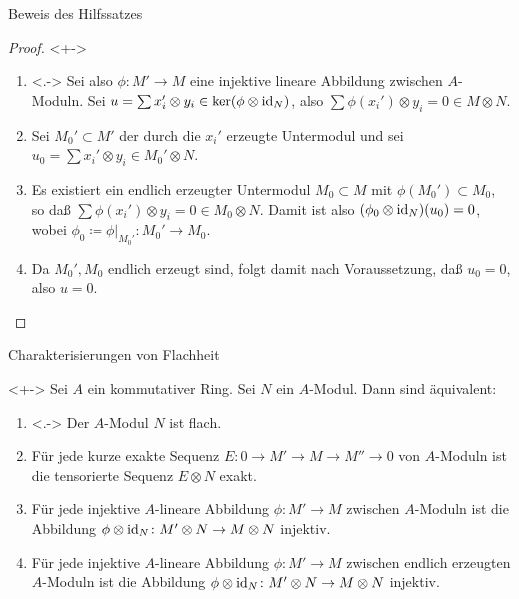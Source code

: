 \begin{frame}{Beweis des Hilfssatzes}
	\begin{proof}<+->
		\begin{enumerate}[<+->]
		\item<.->
			Sei also \(\phi\colon M' \to M\) eine injektive lineare Abbildung zwischen \(A\)-Moduln. Sei
			\(u = \sum x_i' \otimes y_i \in \ker (\phi \otimes \operatorname{id}_N)\), also \(\sum \phi(x_i') \otimes y_i = 0
			\in M \otimes N\).
		\item
			Sei \(M_0' \subset M'\) der durch die \(x_i'\) erzeugte Untermodul und sei \(u_0 = \sum x_i' \otimes y_i 
			\in M_0' \otimes N\).
		\item
			Es existiert ein endlich erzeugter Untermodul \(M_0 \subset M\) mit \(\phi(M_0') \subset M_0\), so daß
			\(\sum \phi(x_i') \otimes y_i = 0 \in M_0 \otimes N\). Damit ist also \((\phi_0 \otimes \operatorname{id}_N)(u_0) = 0\),
			wobei \(\phi_0 \coloneqq \phi|_{M_0'}\colon M_0' \to M_0\).
		\item 
			Da \(M_0', M_0\) endlich erzeugt sind, folgt damit nach Voraussetzung, daß \(u_0 = 0\), also \(u = 0\).
			\qedhere
		\end{enumerate}
	\end{proof}
\end{frame}

\begin{frame}{Charakterisierungen von Flachheit}
	\begin{proposition}<+->
		Sei \(A\) ein kommutativer Ring. Sei \(N\) ein \(A\)-Modul. Dann sind äquivalent:
		\begin{enumerate}[<+->]
		\item<.->
			Der \(A\)-Modul \(N\) ist flach.
		\item
			Für jede kurze exakte Sequenz \(E\colon 0 \to M' \to M \to M'' \to 0\) von \(A\)-Moduln ist die tensorierte
			Sequenz \(E \otimes N\) exakt.
		\item
			Für jede injektive \(A\)-lineare Abbildung \(\phi\colon M' \to M\) zwischen \(A\)-Moduln ist die
			Abbildung \(\phi \otimes \operatorname{id}_N\colon M' \otimes N \to M \otimes N\) injektiv.
		\item
			Für jede injektive \(A\)-lineare Abbildung \(\phi\colon M' \to M\) zwischen endlich erzeugten \(A\)-Moduln
			ist die Abbildung \(\phi\otimes\operatorname{id}_N\colon M' \otimes N \to M \otimes N\) injektiv.
		\end{enumerate}
	\end{proposition}
\end{frame}

